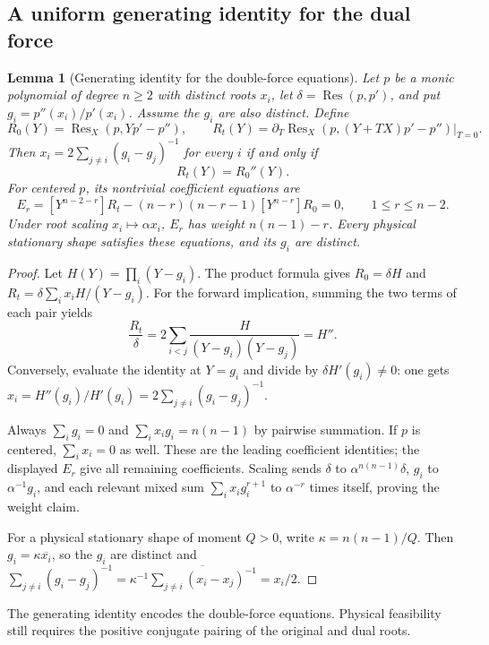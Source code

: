 \documentclass[11pt]{article}
\newtheorem{lemma}[theorem]{Lemma}
\theoremstyle{remark}
\numberwithin{equation}{section}
\begin{document}
\subsection{A uniform generating identity for the dual force}
\begin{lemma}[Generating identity for the double-force equations]
\label{lem:general-dual-resultant-identity}
Let $p$ be a monic polynomial of degree $n\ge2$ with distinct roots $x_i$,
let $\delta=\operatorname{Res}(p,p')$, and put
$g_i=p''(x_i)/p'(x_i)$. Assume the $g_i$ are also distinct. Define
\[
 R_0(Y)=\operatorname{Res}_X(p,Yp'-p''),\qquad
 R_t(Y)=\left.\partial_T\operatorname{Res}_X
 (p,(Y+TX)p'-p'')\right|_{T=0}.
\]
Then $x_i=2\sum_{j\ne i}(g_i-g_j)^{-1}$ for every $i$ if and only if
\begin{equation}\label{eq:general-dual-resultant-identity}
 R_t(Y)=R_0''(Y).
\end{equation}
For centered $p$, its nontrivial coefficient equations are
\[
 E_r=[Y^{n-2-r}]R_t-(n-r)(n-r-1)[Y^{n-r}]R_0=0,
 \qquad 1\le r\le n-2.
\]
Under root scaling $x_i\mapsto\alpha x_i$, $E_r$ has weight
$n(n-1)-r$. Every physical stationary shape satisfies these equations,
and its $g_i$ are distinct.
\end{lemma}
\begin{proof}
Let $H(Y)=\prod_i(Y-g_i)$. The product formula gives
$R_0=\delta H$ and $R_t=\delta\sum_i x_iH/(Y-g_i)$.
For the forward implication, summing the two terms of each pair yields
\[
 \frac{R_t}\delta
 =2\sum_{i<j}\frac{H}{(Y-g_i)(Y-g_j)}=H''.
\]
Conversely, evaluate the identity at $Y=g_i$ and divide by
$\delta H'(g_i)\ne0$: one gets
$x_i=H''(g_i)/H'(g_i)=2\sum_{j\ne i}(g_i-g_j)^{-1}$.

Always $\sum_i g_i=0$ and $\sum_i x_ig_i=n(n-1)$ by pairwise
summation. If $p$ is centered, $\sum_i x_i=0$ as well. These are
the leading coefficient identities; the displayed $E_r$ give all
remaining coefficients. Scaling sends $\delta$ to
$\alpha^{n(n-1)}\delta$, $g_i$ to $\alpha^{-1}g_i$, and each relevant
mixed sum $\sum_i x_i g_i^{r+1}$ to $\alpha^{-r}$ times itself,
proving the weight claim.

For a physical stationary shape of moment $Q>0$, write
$\kappa=n(n-1)/Q$. Then $g_i=\kappa\overline{x_i}$, so the $g_i$
are distinct and
$\sum_{j\ne i}(g_i-g_j)^{-1}
=\kappa^{-1}\overline{\sum_{j\ne i}(x_i-x_j)^{-1}}=x_i/2$.
\end{proof}

The generating identity encodes the double-force equations. Physical feasibility still requires the positive conjugate pairing of the original and dual roots.
\end{document}
